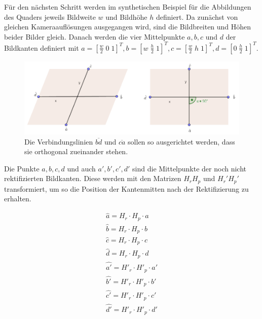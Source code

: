 Für den nächsten Schritt werden im synthetischen Beispiel für die Abbildungen des Quaders jeweils Bildweite $w$ und Bildhöhe $h$ definiert. Da zunächst von gleichen Kameraauflösungen ausgegangen wird, sind die Bildbreiten und Höhen beider Bilder gleich. Danach werden die vier Mittelpunkte $a,b,c$ und $d$ der Bildkanten definiert mit $a = [\frac{w}{2} \; 0 \; 1]^T, b = [w \; \frac{h}{2}\; 1]^T, c = [\frac{w}{2} \; h \; 1]^T, d = [0 \; \frac{h}{2} \; 1]^T$.

\pagebreak

\begin{figure}[!htb]
	\centering
	\includegraphics[width=.8\linewidth]{images/Scherungstransformation.png}
	\caption[Wiederherstellung der Orthogonalität]{Die Verbindungslinien  $\overline{bd}$ und $\overline{ca}$ sollen so ausgerichtet werden, dass sie orthogonal zueinander stehen.} 
	\label{fig:PreserveAspectRatio}
\end{figure}

Die Punkte $a,b,c,d$ und auch $a',b',c',d'$ sind die Mittelpunkte der noch nicht rektifizierten Bildkanten. Diese werden mit den Matrizen $H_rH_p$ und $H_r'H_p'$ transformiert, um so die Position der Kantenmitten nach der Rektifizierung zu erhalten.


\begin{gather*}
	\hat{a} = H_r\cdot H_p \cdot a\\
	\hat{b} = H_r\cdot H_p \cdot b\\
	\hat{c} = H_r\cdot H_p \cdot c\\
	\hat{d} = H_r\cdot H_p \cdot d\\
	\hat{a'} = H'_r\cdot H'_p \cdot a'\\
	\hat{b'} = H'_r\cdot H'_p \cdot b'\\
	\hat{c'} = H'_r\cdot H'_p \cdot c'\\
	\hat{d'} = H'_r\cdot H'_p \cdot d'\\
\end{gather*}

